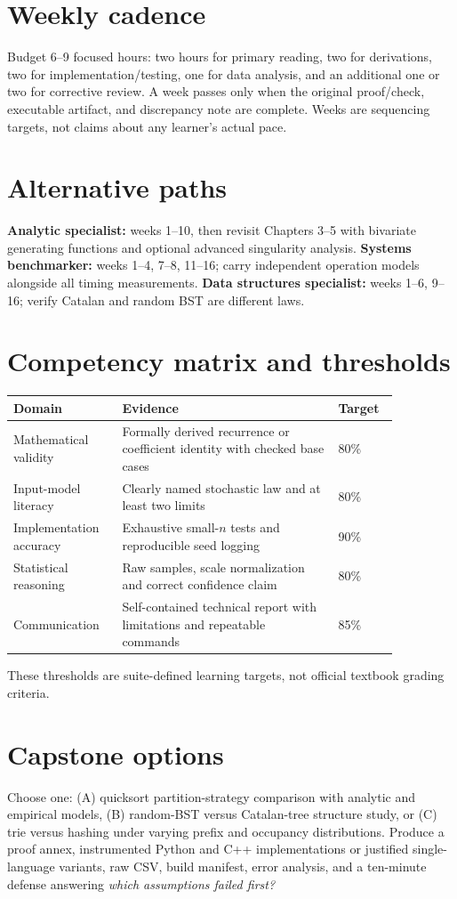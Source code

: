 \documentclass[11pt]{article}
\begin{document}
\section{Weekly cadence}
Budget 6--9 focused hours: two hours for primary reading, two for derivations, two for implementation/testing, one for data analysis, and an additional one or two for corrective review. A week passes only when the original proof/check, executable artifact, and discrepancy note are complete. Weeks are sequencing targets, not claims about any learner's actual pace.
\section{Alternative paths}
\textbf{Analytic specialist:} weeks 1--10, then revisit Chapters 3--5 with bivariate generating functions and optional advanced singularity analysis. \textbf{Systems benchmarker:} weeks 1--4, 7--8, 11--16; carry independent operation models alongside all timing measurements. \textbf{Data structures specialist:} weeks 1--6, 9--16; verify Catalan and random BST are different laws.
\section{Competency matrix and thresholds}
\begin{longtable}{p{0.22\linewidth}p{0.50\linewidth}p{0.14\linewidth}}\toprule Domain & Evidence & Target \\ \midrule
Mathematical validity & Formally derived recurrence or coefficient identity with checked base cases & 80\% \\
Input-model literacy & Clearly named stochastic law and at least two limits & 80\% \\
Implementation accuracy & Exhaustive small-$n$ tests and reproducible seed logging & 90\% \\
Statistical reasoning & Raw samples, scale normalization and correct confidence claim & 80\% \\
Communication & Self-contained technical report with limitations and repeatable commands & 85\% \\
\bottomrule\end{longtable}
These thresholds are suite-defined learning targets, not official textbook grading criteria.
\section{Capstone options}
Choose one: (A) quicksort partition-strategy comparison with analytic and empirical models, (B) random-BST versus Catalan-tree structure study, or (C) trie versus hashing under varying prefix and occupancy distributions. Produce a proof annex, instrumented Python and C++ implementations or justified single-language variants, raw CSV, build manifest, error analysis, and a ten-minute defense answering \emph{which assumptions failed first?}
\end{document}
